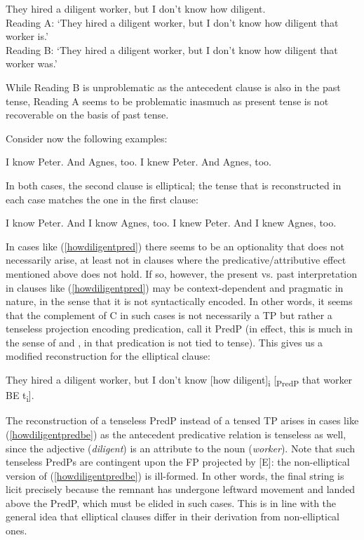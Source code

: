 \ea They hired a diligent worker, but I don't know how diligent. \label{workerreading}\\
Reading A: `They hired a diligent worker, but I don't know how diligent that worker is.'\\
Reading B: `They hired a diligent worker, but I don't know how diligent that worker was.'
\z

While Reading B is unproblematic as the antecedent clause is also in the past tense, Reading A seems to be problematic inasmuch as present tense is not recoverable on the basis of past tense. 

Consider now the following examples:

\ea
\ea I know Peter. And Agnes, too.
\ex I knew Peter. And Agnes, too.
\z
\z

In both cases, the second clause is elliptical; the tense that is reconstructed in each case matches the one in the first clause:

\ea
\ea I know Peter. And I know Agnes, too.
\ex I knew Peter. And I knew Agnes, too.
\z
\z

In cases like (\ref{howdiligentpred}) there seems to be an optionality that does not necessarily arise, at least not in clauses where the predicative/attributive effect mentioned above does not hold. If so, however, the present vs. past interpretation in clauses like (\ref{howdiligentpred}) may be context-dependent and pragmatic in nature, in the sense that it is not syntactically encoded. In other words, it seems that the complement of C in such cases is not necessarily a TP but rather a tenseless projection encoding predication, call it PredP (in effect, this is much in the sense of \citealt{bowers1993, bowers2010} and \citealt{dendikken2006}, in that predication is not tied to tense). This gives us a modified reconstruction for the elliptical clause:

\ea They hired a diligent worker, but I don't know [how diligent]\textsubscript{i} [\textsubscript{PredP} that worker BE t\textsubscript{i}]. \label{howdiligentpredbe}
\z

The reconstruction of a tenseless PredP instead of a tensed TP arises in cases like (\ref{howdiligentpredbe}) as the antecedent predicative relation is tenseless as well, since the adjective (\textit{diligent}) is an attribute to the noun (\textit{worker}). Note that such tenseless PredPs are contingent upon the FP projected by [E]: the non-elliptical version of (\ref{howdiligentpredbe}) is ill-formed. In other words, the final string is licit precisely because the remnant has undergone leftward movement and landed above the PredP, which must be elided in such cases. This is in line with the general idea that elliptical clauses differ in their derivation from non-elliptical ones.

